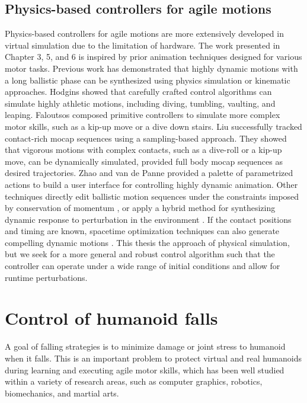 \subsection{Physics-based controllers for agile motions}
Physics-based controllers for agile motions are more extensively
developed in virtual simulation due to the limitation of hardware.
The work presented in Chapter 3, 5, and 6 is inspired by prior
animation techniques designed for various motor tasks.
Previous work has demonstrated that highly
dynamic motions with a long ballistic phase can be synthesized using
physics simulation or kinematic approaches. Hodgins \etal
\cite{Hodgins:1995:AHA,Wooten:1998:Phd} showed that carefully
crafted control algorithms can simulate highly athletic motions,
including diving, tumbling, vaulting, and leaping. Faloutsos \etal
\cite{Faloutsos:2001:CCF} composed primitive controllers to
simulate more complex motor skills, such as a kip-up move or a dive
down stairs. Liu \etal \cite{Liu:2010:SCM} successfully tracked
contact-rich mocap sequences using a sampling-based approach. They
showed that vigorous motions with complex contacts, such as a
dive-roll or a kip-up move, can be dynamically simulated, provided
full body mocap sequences as desired trajectories. Zhao and van de
Panne \cite{Zhao:2005:UII} provided a palette of parametrized
actions to build a user interface for controlling highly dynamic
animation.  Other techniques directly edit ballistic motion sequences
under the constraints imposed by conservation of momentum
\cite{Majkowska:2007:FPM,Sok:2010:EDH}, or apply a hybrid method for
synthesizing dynamic response to perturbation in the environment
\cite{Shapiro:2003:HCI}.  If the contact positions and timing are
known, spacetime optimization techniques can also generate compelling
dynamic motions
\cite{Liu:2002:SCD,Fang:2003:ESP,Safonova:2004:SPR,Sulejmanpavic:2004:APB}.
This thesis the approach of physical simulation, 
but we seek for a more general and robust control algorithm such that the
controller can operate under a wide range of initial conditions and
allow for runtime perturbations. 



\section{Control of humanoid falls}
\label{sec:related_falling}
A goal of falling strategies is to minimize damage or joint stress to
humanoid when it falls.
This is an important problem to protect virtual and real humanoids during
learning and executing agile motor skills, which has
been well studied within a variety of research areas, such as computer
graphics, robotics, biomechanics, and martial arts.

